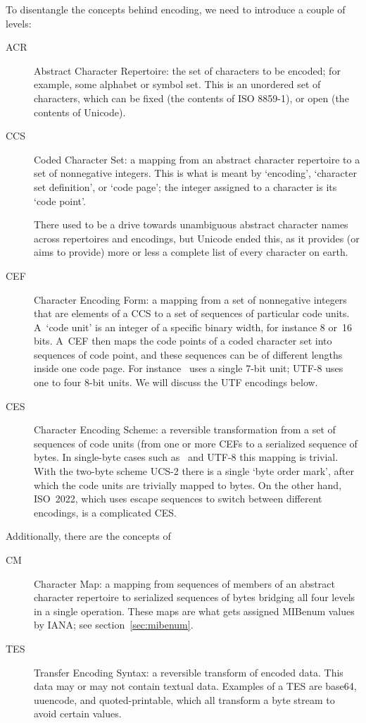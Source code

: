To disentangle the concepts behind encoding, we need to introduce a
couple of levels:
\begin{description}
\item[ACR] Abstract Character Repertoire: the set of characters to be
  encoded; for example, some alphabet or symbol set. This is an
  unordered set of characters, which can be fixed (the contents of ISO
  8859-1), or open (the contents of Unicode).
\item[CCS] Coded Character Set: a mapping from an abstract character
  repertoire to a set of nonnegative integers. This is what is meant
  by `encoding', `character set definition', or `code page'; the
  integer assigned to a character is its `code
  point'.

  There used to be a drive towards unambiguous abstract character
  names across repertoires and encodings, but Unicode ended this, as
  it provides (or aims to provide) more or less a complete list of
  every character on earth.
\item[CEF] Character Encoding Form: a mapping from a set of
  nonnegative integers that are elements of a CCS to a set of
  sequences of particular code units. A~`code unit'
  is an integer of a specific binary width, for instance 8 or~16
  bits. A~CEF then maps the code points of a coded character set into
  sequences of code point, and these sequences can be of different
  lengths inside one code page. For instance 
 \ascii\ uses a single 7-bit unit; 
  UTF-8 uses one to four 8-bit units.
  We will discuss the UTF encodings below.
\item[CES] Character Encoding Scheme: a reversible transformation from
  a set of sequences of code units (from one or more CEFs to a
  serialized sequence of bytes. In single-byte cases such as \ascii\
  and UTF-8 this mapping is trivial. With the two-byte scheme UCS-2
  there is a single `\index{byte order mark}byte order mark', after
  which the code units are trivially mapped to bytes. On the other
  hand, ISO~2022, which uses escape sequences to switch between
  different encodings, is a complicated CES.
\end{description}
Additionally, there are the concepts of
\begin{description}
\item[CM] Character Map: a mapping from sequences of members of an
  abstract character repertoire to serialized sequences of bytes
  bridging all four levels in a single operation. These maps are what
  gets assigned MIBenum values by IANA; see section~\ref{sec:mibenum}.
\item[TES] Transfer Encoding Syntax: a reversible transform of encoded
  data. This data may or may not contain textual data. Examples of a
  TES are base64, uuencode, and quoted-printable, which all transform
  a byte stream to avoid certain values.
\end{description}

